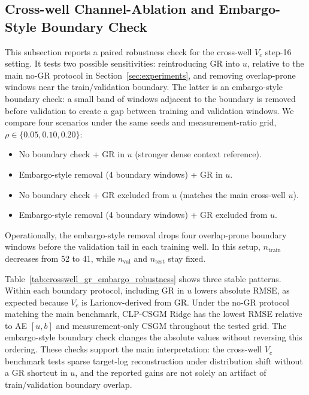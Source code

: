 \subsection{Cross-well Channel-Ablation and Embargo-Style Boundary Check}
\label{app:crosswell_gr_embargo}

This subsection reports a paired robustness check for the cross-well \(V_c\)
step-16 setting. It tests two possible sensitivities: reintroducing GR into
\(u\), relative to the main no-GR protocol in Section~\ref{sec:experiments}, and
removing overlap-prone windows near the train/validation boundary. The latter is
an embargo-style boundary check: a small band of windows adjacent to the boundary
is removed before validation to create a gap between training and validation
windows. We compare four scenarios under the same seeds and measurement-ratio
grid, \(\rho\in\{0.05,0.10,0.20\}\):
\begin{itemize}
  \item No boundary check + GR in \(u\) (stronger dense context reference).
  \item Embargo-style removal (4 boundary windows) + GR in \(u\).
  \item No boundary check + GR excluded from \(u\) (matches the main cross-well \(u\)).
  \item Embargo-style removal (4 boundary windows) + GR excluded from \(u\).
\end{itemize}

Operationally, the embargo-style removal drops four overlap-prone boundary
windows before the validation tail in each training well. In this setup,
\(n_{\mathrm{train}}\) decreases from 52 to 41, while \(n_{\mathrm{val}}\) and
\(n_{\mathrm{test}}\) stay fixed.

\begin{table}[htbp]
  \centering
  \caption{Cross-well step-16 robustness check across GR ablation and
  embargo-style boundary-check scenarios. Ridge RMSE is reported as mean \(\pm\)
  std over three seeds. Gains are relative RMSE reductions of CLP-CSGM Ridge
  against AE \([u,b]\) and measurement-only CSGM.}
  \label{tab:crosswell_gr_embargo_robustness}
  \small
\end{table}

Table~\ref{tab:crosswell_gr_embargo_robustness} shows three stable patterns.
Within each boundary protocol, including GR in \(u\) lowers absolute RMSE, as
expected because \(V_c\) is Larionov-derived from GR. Under the no-GR protocol
matching the main benchmark, CLP-CSGM Ridge has the lowest RMSE relative to AE
\([u,b]\) and measurement-only CSGM throughout the tested grid. The embargo-style
boundary check changes the absolute values without reversing this ordering.
These checks support the main interpretation: the cross-well \(V_c\) benchmark
tests sparse target-log reconstruction under distribution shift without a GR
shortcut in \(u\), and the reported gains are not solely an artifact of
train/validation boundary overlap.


